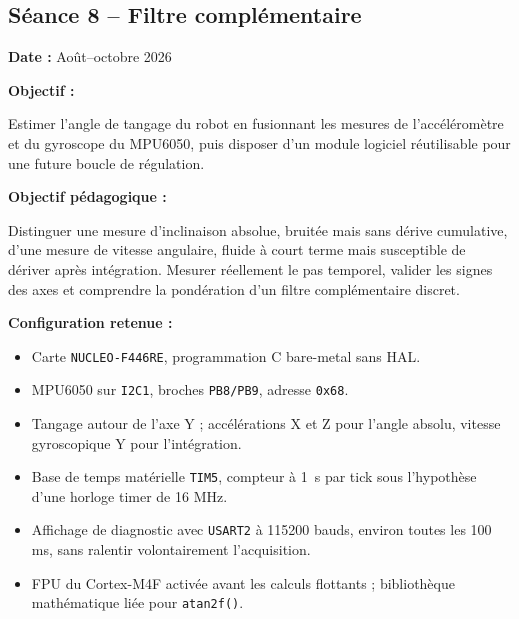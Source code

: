 \documentclass[11pt,a4paper]{article}
\begin{document}
	\subsection*{Séance 8 -- Filtre complémentaire}
	
	\begin{sessionbox}
		
		\textbf{Date :} Août--octobre 2026
		
		\vspace{0.3cm}
		
		\textbf{Objectif :}
		
		Estimer l'angle de tangage du robot en fusionnant les mesures de l'accéléromètre et du gyroscope du MPU6050, puis disposer d'un module logiciel réutilisable pour une future boucle de régulation.
		
		\vspace{0.3cm}
		
		\textbf{Objectif pédagogique :}
		
		Distinguer une mesure d'inclinaison absolue, bruitée mais sans dérive cumulative, d'une mesure de vitesse angulaire, fluide à court terme mais susceptible de dériver après intégration. Mesurer réellement le pas temporel, valider les signes des axes et comprendre la pondération d'un filtre complémentaire discret.
		
		\vspace{0.3cm}
		
		\textbf{Configuration retenue :}
		
		\begin{itemize}
			\item Carte \texttt{NUCLEO-F446RE}, programmation C bare-metal sans HAL.
			\item MPU6050 sur \texttt{I2C1}, broches \texttt{PB8/PB9}, adresse \texttt{0x68}.
			\item Tangage autour de l'axe Y ; accélérations X et Z pour l'angle absolu, vitesse gyroscopique Y pour l'intégration.
			\item Base de temps matérielle \texttt{TIM5}, compteur à 1~\textmu s par tick sous l'hypothèse d'une horloge timer de 16 MHz.
			\item Affichage de diagnostic avec \texttt{USART2} à 115200 bauds, environ toutes les 100 ms, sans ralentir volontairement l'acquisition.
			\item FPU du Cortex-M4F activée avant les calculs flottants ; bibliothèque mathématique liée pour \texttt{atan2f()}.
		\end{itemize}
		

\end{sessionbox}
\end{document}
